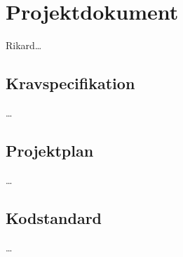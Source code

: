 \section{Projektdokument}
Rikard\ldots
\subsection{Kravspecifikation}
\ldots
\subsection{Projektplan}
\ldots
\subsection{Kodstandard}
\ldots